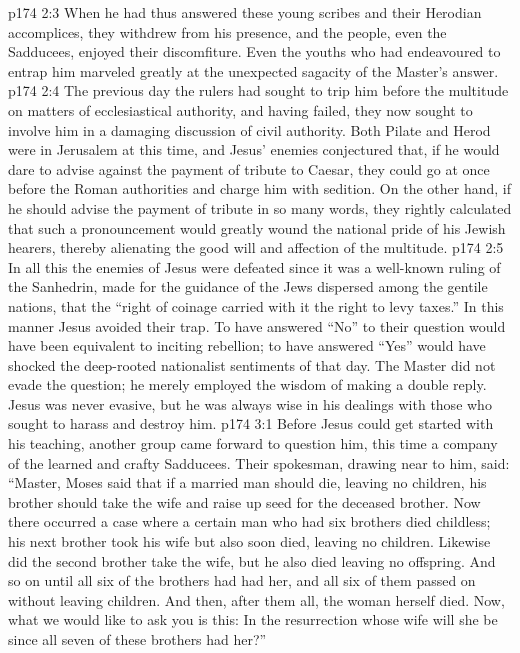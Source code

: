 \vs p174 2:3 When he had thus answered these young scribes and their Herodian accomplices, they withdrew from his presence, and the people, even the Sadducees, enjoyed their discomfiture. Even the youths who had endeavoured to entrap him marveled greatly at the unexpected sagacity of the Master’s answer.
\vs p174 2:4 The previous day the rulers had sought to trip him before the multitude on matters of ecclesiastical authority, and having failed, they now sought to involve him in a damaging discussion of civil authority. Both Pilate and Herod were in Jerusalem at this time, and Jesus’ enemies conjectured that, if he would dare to advise against the payment of tribute to Caesar, they could go at once before the Roman authorities and charge him with sedition. On the other hand, if he should advise the payment of tribute in so many words, they rightly calculated that such a pronouncement would greatly wound the national pride of his Jewish hearers, thereby alienating the good will and affection of the multitude.
\vs p174 2:5 In all this the enemies of Jesus were defeated since it was a well\hyp{}known ruling of the Sanhedrin, made for the guidance of the Jews dispersed among the gentile nations, that the “right of coinage carried with it the right to levy taxes.” In this manner Jesus avoided their trap. To have answered “No” to their question would have been equivalent to inciting rebellion; to have answered “Yes” would have shocked the deep\hyp{}rooted nationalist sentiments of that day. The Master did not evade the question; he merely employed the wisdom of making a double reply. Jesus was never evasive, but he was always wise in his dealings with those who sought to harass and destroy him.
\vs p174 3:1 Before Jesus could get started with his teaching, another group came forward to question him, this time a company of the learned and crafty Sadducees. Their spokesman, drawing near to him, said: “Master, Moses said that if a married man should die, leaving no children, his brother should take the wife and raise up seed for the deceased brother. Now there occurred a case where a certain man who had six brothers died childless; his next brother took his wife but also soon died, leaving no children. Likewise did the second brother take the wife, but he also died leaving no offspring. And so on until all six of the brothers had had her, and all six of them passed on without leaving children. And then, after them all, the woman herself died. Now, what we would like to ask you is this: In the resurrection whose wife will she be since all seven of these brothers had her?”
